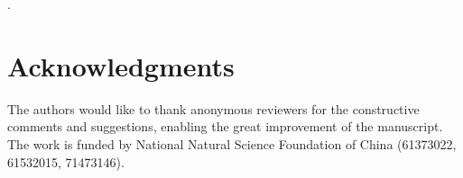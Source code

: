 \documentclass[10pt,journal,compsoc]{IEEEtran}
\begin{document}
\maketitle.

\IEEEdisplaynontitleabstractindextext

\IEEEpeerreviewmaketitle








\section*{Acknowledgments}

The authors would like to thank anonymous reviewers for the constructive comments and suggestions, enabling the great improvement of the manuscript.
The work is funded by National Natural Science Foundation of China (61373022, 61532015, 71473146).

%
%
%
%
%
%
%

%

\end{document}
